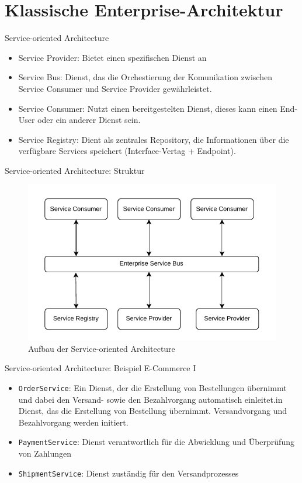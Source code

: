 \section{Klassische Enterprise-Architektur}

\begin{frame}{Service-oriented Architecture}
\begin{itemize}
  \item Service Provider: Bietet einen spezifischen Dienst an
  \item Service Bus: Dienst, das die Orchestierung der Komunikation zwischen Service Consumer und Service Provider gewährleistet.
  \item Service Consumer: Nutzt einen bereitgestelten Dienst, dieses kann einen End-User oder ein anderer Dienst sein.
  \item Service Registry: Dient als zentrales Repository, die Informationen über die verfügbare Services speichert (Interface-Vertag + Endpoint).
\end{itemize}
\begin{frame}{Service-oriented Architecture: Struktur}

    \begin{figure}[!h]
        \centering
        \includegraphics[scale=0.55]{imglib/soa/soa.pdf}
        \caption{Aufbau der Service-oriented Architecture}
        \label{fig:soa}
    \end{figure}
\end{frame}

\begin{frame}{Service-oriented Architecture: Beispiel E-Commerce I}
    \begin{itemize}
        \item \texttt{OrderService}: Ein Dienst, der die Erstellung von Bestellungen übernimmt und dabei den Versand- sowie den Bezahlvorgang automatisch einleitet.in Dienst, das die Erstellung von Bestellung übernimmt. Versandvorgang und Bezahlvorgang werden initiert.
        \item \texttt{PaymentService}: Dienst verantwortlich für die Abwicklung und Überprüfung von Zahlungen
        \item \texttt{ShipmentService}: Dienst zuständig für den Versandprozesses
    \end{itemize}
\end{frame}


\end{frame}
